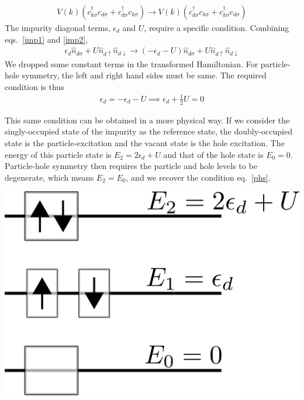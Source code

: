 \documentclass[twoside,11pt]{report}
\numberwithin{equation}{section}
\begin{document}
\begin{equation}\begin{aligned}
	V(k)\left(c^\dagger_{k\sigma}c_{d\sigma} + c^\dagger_{d\sigma}c_{k\sigma}\right)\to V(k)\left(c^\dagger_{d\sigma}c_{k\sigma} + c^\dagger_{k\sigma}c_{d\sigma}\right)
\end{aligned}\end{equation}
The impurity diagonal terms, \(\epsilon_d\) and \(U\), require a specific condition. Combining eqs.~\ref{imp1} and \ref{imp2},
\begin{equation}\begin{aligned}
	\epsilon_d\hat n_{d\sigma} + U\hat n_{d\uparrow}\hat n_{d\downarrow} \to \left(-\epsilon_d - U\right)\hat n_{d\sigma} + U\hat n_{d\uparrow}\hat n_{d\downarrow}
\end{aligned}\end{equation}
We dropped some constant terms in the transformed Hamiltonian. For particle-hole symmetry, the left and right hand sides must be same. The required condition is thus 
\begin{equation}\begin{aligned}
	\label{phs}
\epsilon_d = -\epsilon_d - U \implies \epsilon_d + \frac{1}{2} U = 0
\end{aligned}\end{equation}
\begin{minipage}{260pt}
    This same condition can be obtained in a more physical way. If we consider the singly-occupied state of the impurity as the reference state, the doubly-occupied state is the particle-excitation and the vacant state is the hole excitation. The energy of this particle state is \(E_2 = 2\epsilon_d + U\) and that of the hole state is \(E_0 = 0\). Particle-hole symmetry then requires the particle and hole levels to be degenerate, which means \(E_2 = E_0\), and we recover the condition eq.~\ref{phs}.
\end{minipage}
\hspace*{15pt}\begin{minipage}{200pt}
    \centering\includegraphics[scale=0.3]{phsymm.png}
\end{minipage}
\end{document}
